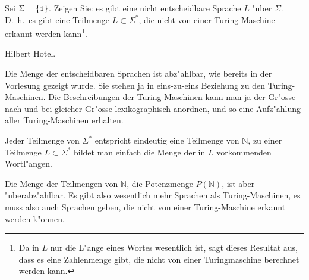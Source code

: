 Sei $\Sigma=\{{\tt 1}\}$. Zeigen Sie: es gibt eine nicht entscheidbare
Sprache $L$ "uber $\Sigma$.
D.~h.~es gibt eine Teilmenge $L\subset \Sigma^*$, die nicht
von einer Turing-Maschine erkannt werden kann\footnote{Da in $L$
nur die L"ange eines Wortes wesentlich ist, sagt dieses Resultat
aus, dass es eine Zahlenmenge gibt, die nicht von einer Turingmaschine
berechnet werden kann.}.

\begin{hinweis}
Hilbert Hotel.
\end{hinweis}

\begin{loesung}
Die Menge der entscheidbaren Sprachen ist abz"ahlbar, wie bereits in
der Vorlesung gezeigt wurde. Sie stehen ja
in eins-zu-eins Beziehung zu den Turing-Maschinen. Die Beschreibungen
der Turing-Maschinen kann man ja der Gr"osse nach und bei gleicher Gr"osse
lexikographisch anordnen, und so eine Auf\-z"ahlung aller Turing-Maschinen
erhalten.

Jeder Teilmenge von $\Sigma^*$ entspricht eindeutig eine Teilmenge
von $\mathbb N$, zu einer Teilmenge $L\subset\Sigma^*$
bildet man einfach die Menge der in $L$ vorkommenden Wortl"angen.

Die Menge der Teilmengen von $\mathbb N$, die Potenzmenge $P(\mathbb N)$,
ist aber "uberabz"ahlbar.
Es gibt also wesentlich mehr Sprachen als Turing-Maschinen, es
muss also auch Sprachen geben, die nicht von einer Turing-Maschine
erkannt werden k"onnen.
\end{loesung}
